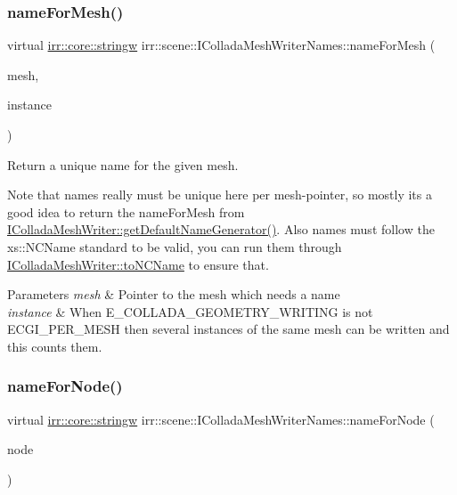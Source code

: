 \subsubsection{\texorpdfstring{name\+For\+Mesh()}{nameForMesh()}}
{\footnotesize\ttfamily virtual \hyperlink{namespaceirr_1_1core_aef83fafbb1b36fcce44c07c9be23a7f2}{irr\+::core\+::stringw} irr\+::scene\+::\+I\+Collada\+Mesh\+Writer\+Names\+::name\+For\+Mesh (\begin{DoxyParamCaption}\item[{const \hyperlink{classirr_1_1scene_1_1IMesh}{scene\+::\+I\+Mesh} $\ast$}]{mesh,  }\item[{int}]{instance }\end{DoxyParamCaption})\hspace{0.3cm}{\ttfamily [pure virtual]}}



Return a unique name for the given mesh. 

Note that names really must be unique here per mesh-\/pointer, so mostly it\textquotesingle{}s a good idea to return the name\+For\+Mesh from \hyperlink{classirr_1_1scene_1_1IColladaMeshWriter_acd10fcf2458271d59cf76284613288f6}{I\+Collada\+Mesh\+Writer\+::get\+Default\+Name\+Generator()}. Also names must follow the xs\+::\+N\+C\+Name standard to be valid, you can run them through \hyperlink{classirr_1_1scene_1_1IColladaMeshWriter_ac9c48beab095aa6f4cb4f696bb2ecd45}{I\+Collada\+Mesh\+Writer\+::to\+N\+C\+Name} to ensure that. 
\begin{DoxyParams}{Parameters}
{\em mesh} & Pointer to the mesh which needs a name \\
\hline
{\em instance} & When E\+\_\+\+C\+O\+L\+L\+A\+D\+A\+\_\+\+G\+E\+O\+M\+E\+T\+R\+Y\+\_\+\+W\+R\+I\+T\+I\+NG is not E\+C\+G\+I\+\_\+\+P\+E\+R\+\_\+\+M\+E\+SH then several instances of the same mesh can be written and this counts them. \\
\hline
\end{DoxyParams}
\mbox{\label{classirr_1_1scene_1_1IColladaMeshWriterNames_a60d3fdad90edc25b0305c91be15b255f}} 
\subsubsection{\texorpdfstring{name\+For\+Node()}{nameForNode()}}
{\footnotesize\ttfamily virtual \hyperlink{namespaceirr_1_1core_aef83fafbb1b36fcce44c07c9be23a7f2}{irr\+::core\+::stringw} irr\+::scene\+::\+I\+Collada\+Mesh\+Writer\+Names\+::name\+For\+Node (\begin{DoxyParamCaption}\item[{const \hyperlink{classirr_1_1scene_1_1ISceneNode}{scene\+::\+I\+Scene\+Node} $\ast$}]{node }\end{DoxyParamCaption})\hspace{0.3cm}{\ttfamily [pure virtual]}}



